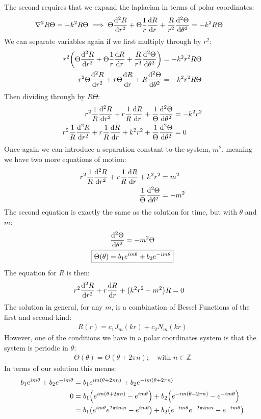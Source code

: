 \documentclass[12pt]{article}
\begin{document}
The second requires that we expand the laplacian in terms of polar coordinates:
\begin{align*}
  \laplacian{R\Theta}&=-k^2R\Theta\implies
  \Theta\dv[2]{R}{r}+\Theta\frac1r\dv{R}{r}+
  \frac{R}{r^2}\dv[2]{\Theta}{\theta}=-k^2R\Theta
\end{align*}
We can separate variables again if we first multiply through by $r^2$:
\begin{align*}
  r^2\qty(\Theta\dv[2]{R}{r}+\Theta\frac1r\dv{R}{r}+
  \frac{R}{r^2}\dv[2]{\Theta}{\theta})&=-k^2r^2R\Theta\\
  r^2\Theta\dv[2]{R}{r}+r\Theta\dv{R}{r}+
  R\dv[2]{\Theta}{\theta}&=-k^2r^2R\Theta
\end{align*}
Then dividing through by $R\Theta$:
\begin{align*}
  r^2\frac1R\dv[2]{R}{r}+r\frac1R\dv{R}{r}+
  \frac1\Theta\dv[2]{\Theta}{\theta}&=-k^2r^2\\
  r^2\frac1R\dv[2]{R}{r}+r\frac1R\dv{R}{r}+k^2r^2
  +\frac1\Theta\dv[2]{\Theta}{\theta}&=0
\end{align*}
Once again we can introduce a separation constant to the system, $m^2$, meaning we have two more equations of motion:
\begin{align*}
  r^2\frac1R\dv[2]{R}{r}+r\frac1R\dv{R}{r}+k^2r^2&=m^2\\
  \frac1\Theta\dv[2]{\Theta}{\theta}&=-m^2
\end{align*}
The second equation is exactly the same as the solution for time, but with $\theta$ and $m$:
\begin{gather*}
  \dv[2]{\Theta}{\theta}=-m^2\Theta\\
  \boxed{\Theta(\theta)=b_1e^{im\theta}+b_2e^{-im\theta}}
\end{gather*}
The equation for $R$ is then:
\begin{align*}
  r^2\dv[2]{R}{r}+r\dv{R}{r}+\qty(k^2r^2-m^2)R&=0
\end{align*}
The solution in general, for any $m$, is a combination of Bessel Functions of the first and second kind:
\begin{align*}
  R(r)=c_1J_m(kr)+c_2N_m(kr)
\end{align*}
However, one of the conditions we have in a polar coordinates system is that the system is periodic in $\theta$:
\begin{align*}
  \Theta(\theta)=\Theta(\theta+2\pi n);\quad \text{with } n\in\mathbb{Z}
\end{align*}
In terms of our solution this means:
\begin{align*}
  b_1e^{im\theta}+b_2e^{-im\theta}&=
  b_1e^{im(\theta+2\pi n)}+b_2e^{-im(\theta+2\pi n)}\\
  0&=b_1\qty(e^{im(\theta+2\pi n)}-e^{im\theta})
  +b_2\qty(e^{-im(\theta+2\pi n)}-e^{-im\theta})\\
  &=b_1\qty(e^{im\theta}e^{2\pi imn}-e^{im\theta})
  +b_2\qty(e^{-im\theta}e^{-2\pi imn}-e^{-im\theta})
\end{align*}
\end{document}
